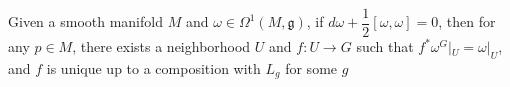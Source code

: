 \documentclass[../main.tex]{subfiles}
\begin{document}
\begin{theorem}
Given a smooth manifold $M$ and $\omega\in\Omega^1(M,\mathfrak g)$, if $d\omega+\dfrac{1}{2}[\omega,\omega]=0$, then for any $p\in M$, there exists a neighborhood $U$ and $f:U\to G$ such that $f^*\omega^G|_U=\omega|_U$, and $f$ is unique up to a composition with $L_g$ for some $g$
\end{theorem}
\end{document}
